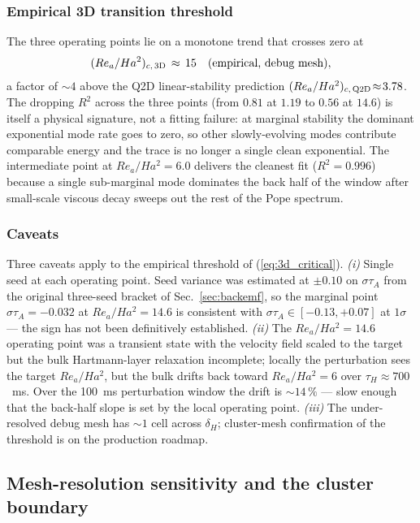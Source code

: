 \documentclass[aps,prl,twocolumn,superscriptaddress]{revtex4-2}
\begin{document}
\subsubsection*{Empirical 3D transition threshold}
The three operating points lie on a monotone trend that crosses
zero at
\begin{equation}
(Re_a/Ha^{2})_{c,\,\rm 3D}\,\approx\, 15
\quad\text{(empirical, debug mesh)},
\label{eq:3d_critical}
\end{equation}
a factor of $\sim\!4$ above the Q2D linear-stability prediction
$(Re_a/Ha^{2})_{c,\,\rm Q2D}\!\approx\!3.78$.  The dropping $R^{2}$
across the three points (from $0.81$ at $1.19$ to $0.56$ at $14.6$)
is itself a physical signature, not a fitting failure: at marginal
stability the dominant exponential mode rate goes to zero, so other
slowly-evolving modes contribute comparable energy and the trace is
no longer a single clean exponential.  The intermediate point at
$Re_a/Ha^{2} = 6.0$ delivers the cleanest fit ($R^{2} = 0.996$)
because a single sub-marginal mode dominates the back half of the
window after small-scale viscous decay sweeps out the rest of the
Pope spectrum.

\subsubsection*{Caveats}
Three caveats apply to the empirical threshold of
(\ref{eq:3d_critical}).  \textit{(i)} Single seed at each operating
point.  Seed variance was estimated at $\pm 0.10$ on $\sigma\tau_A$
from the original three-seed bracket of Sec.~\ref{sec:backemf}, so
the marginal point $\sigma\tau_A = -0.032$ at $Re_a/Ha^{2} = 14.6$
is consistent with $\sigma\tau_A\!\in\![-0.13,+0.07]$ at $1\sigma$ ---
the sign has not been definitively established.  \textit{(ii)} The
$Re_a/Ha^{2} = 14.6$ operating point was a transient state with the
velocity field scaled to the target but the bulk Hartmann-layer
relaxation incomplete; locally the perturbation sees the target
$Re_a/Ha^{2}$, but the bulk drifts back toward $Re_a/Ha^{2} = 6$
over $\tau_H \approx 700$~ms.  Over the 100~ms perturbation window
the drift is $\sim\!14\,\%$ --- slow enough that the back-half slope
is set by the local operating point.  \textit{(iii)} The under-resolved
debug mesh has $\sim\!1$ cell across $\delta_H$; cluster-mesh
confirmation of the threshold is on the production roadmap.

\subsection{Mesh-resolution sensitivity and the cluster boundary}
\label{sec:cluster}
\end{document}
